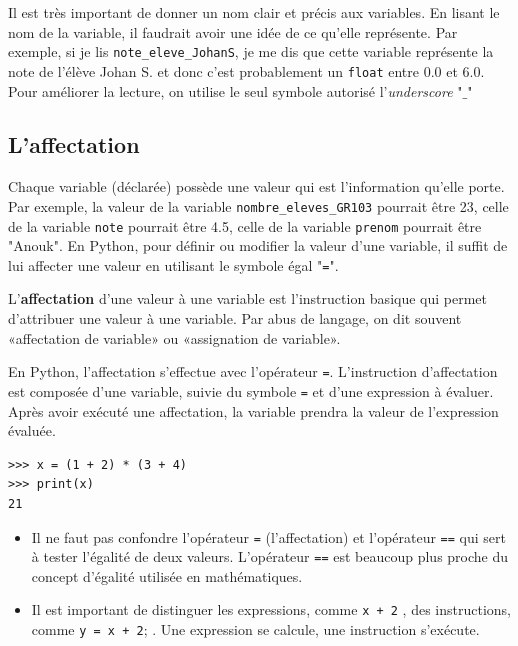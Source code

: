 \documentclass[11pt, a4paper]{book}
\begin{document}
\begin{eclairage}
	Il est très important de donner un nom clair et précis aux variables. En lisant le nom de la variable, il faudrait avoir une idée de ce qu'elle représente.
	Par exemple, si je lis \lstinline{note_eleve_JohanS}, je me dis que cette variable représente la note de l'élève Johan S. et donc c'est probablement un \lstinline{float} entre 0.0 et 6.0. Pour améliorer la lecture, on utilise le seul symbole autorisé l'\textit{underscore} "$\_$"\\
\end{eclairage}


\subsection{L'affectation}
Chaque variable (déclarée) possède une valeur qui est l’information qu’elle porte. Par exemple, la valeur de la variable \lstinline{nombre_eleves_GR103} pourrait être 23, celle de la variable \lstinline{note} pourrait être 4.5, celle de la variable \lstinline{prenom} pourrait être "Anouk".
En Python, pour définir ou modifier la valeur d’une variable, il suffit de lui affecter une valeur en utilisant le symbole égal "\lstinline{=}". 
\begin{mydefinition}
	L’\textbf{affectation} d’une valeur à une variable est l’instruction basique qui permet d’attribuer une valeur à une variable. Par abus de langage, on dit souvent «affectation de variable» ou «assignation de variable».
\end{mydefinition}
En Python, l'affectation s’effectue avec l’opérateur \lstinline{=}. L'instruction d'affectation est composée d'une variable, suivie du symbole  \lstinline{=} et d'une expression à évaluer. Après avoir exécuté une affectation, la variable prendra la valeur de l'expression évaluée.
\begin{myexample}
	\begin{lstlisting}[numbers=none]
>>> x = (1 + 2) * (3 + 4)
>>> print(x)
21
	\end{lstlisting}
\end{myexample}

\begin{important}
	\begin{itemize}
		\item 	Il ne faut pas confondre l'opérateur \lstinline{=} (l'affectation) et l'opérateur \lstinline{==} qui sert à tester l'égalité de deux valeurs. L'opérateur \lstinline{==} est beaucoup plus proche du concept d'égalité utilisée en mathématiques.
		\item Il est important de distinguer les expressions, comme \lstinline{x + 2} , des instructions, comme \lstinline{y = x + 2}; . Une expression se calcule, une instruction s’exécute.
	\end{itemize}
	
\end{important}
\end{document}
